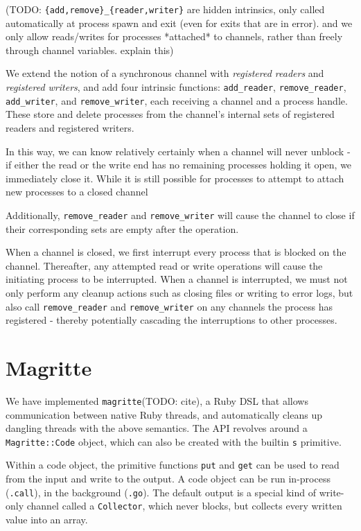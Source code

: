 \documentclass[format=sigconf, review=true, draft=true, screen=true]{acmart}
\begin{document}
(TODO: \verb/{add,remove}_{reader,writer}/ are hidden intrinsics, only called automatically at process spawn and exit (even for exits that are in error). and we only allow reads/writes for processes *attached* to channels, rather than freely through channel variables. explain this)

We extend the notion of a synchronous channel with \emph{registered readers} and \emph{registered writers}, and add four intrinsic functions: \verb/add_reader/, \verb/remove_reader/, \verb/add_writer/, and \verb/remove_writer/, each receiving a channel and a process handle.
These store and delete processes from the channel's internal sets of registered readers and registered writers.

In this way, we can know relatively certainly when a channel will never unblock - if either the read or the write end has no remaining processes holding it open, we immediately close it. While it is still possible for processes to attempt to attach new processes to a closed channel

Additionally, \verb/remove_reader/ and \verb/remove_writer/ will cause the channel to close if their corresponding sets are empty after the operation.

When a channel is closed, we first interrupt every process that is blocked on the channel.
Thereafter, any attempted read or write operations will cause the initiating process to be interrupted.
When a channel is interrupted, we must not only perform any cleanup actions such as closing files or writing to error logs, but also call \verb/remove_reader/ and \verb/remove_writer/ on any channels the process has registered - thereby potentially cascading the interruptions to other processes.


\section{Magritte}

We have implemented \verb/magritte/(TODO: cite), a Ruby DSL that allows communication between native Ruby threads, and automatically cleans up dangling threads with the above semantics.
The API revolves around a \verb/Magritte::Code/ object, which can also be created with the builtin \verb/s/ primitive.

Within a code object, the primitive functions \verb/put/ and \verb/get/ can be used to read from the input and write to the output.
A code object can be run in-process (\verb/.call/), in the background (\verb/.go/).
The default output is a special kind of write-only channel called a \verb/Collector/, which never blocks, but collects every written value into an array.
\end{document}
